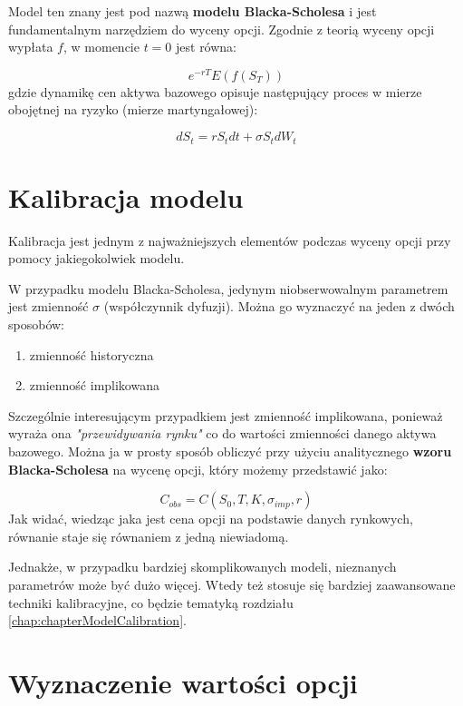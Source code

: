 \documentclass{pracamgr}
\begin{document}
Model ten znany jest pod nazwą \textbf{modelu Blacka-Scholesa} i jest fundamentalnym narzędziem do wyceny opcji.
Zgodnie z teorią wyceny opcji wypłata $f$, w momencie $t = 0$ jest równa:

\begin{equation}
  e^{-rT} E(f(S_T))
\end{equation}
gdzie dynamikę cen aktywa bazowego opisuje następujący proces w mierze obojętnej na ryzyko (mierze martyngałowej):

\begin{equation}
  dS_t = r S_t dt + \sigma S_t d W_t 
\end{equation}


\section{Kalibracja modelu}
Kalibracja jest jednym z najważniejszych elementów podczas wyceny opcji przy pomocy jakiegokolwiek modelu.  

W przypadku modelu Blacka-Scholesa, jedynym niobserwowalnym parametrem jest zmienność $\sigma$ (współczynnik dyfuzji).
Można go wyznaczyć na jeden z dwóch sposobów:
\begin{enumerate}
  \item zmienność historyczna
  \item zmienność implikowana
\end{enumerate}

Szczególnie interesującym przypadkiem jest zmienność implikowana, ponieważ wyraża ona \textit{"przewidywania rynku"} co 
do wartości zmienności danego aktywa bazowego. 
Można ja w prosty sposób obliczyć przy użyciu analitycznego \textbf{wzoru Blacka-Scholesa} na wycenę opcji, który 
możemy przedstawić jako:

\begin{equation}
  C_{obs} = C(S_0, T, K, \sigma_{imp}, r)
\end{equation}
Jak widać, wiedząc jaka jest cena opcji na podstawie danych rynkowych, równanie staje się równaniem z jedną niewiadomą. 

Jednakże, w przypadku bardziej skomplikowanych modeli, nieznanych parametrów może być dużo więcej. Wtedy też 
stosuje się bardziej zaawansowane techniki kalibracyjne, co będzie tematyką rozdziału \ref{chap:chapterModelCalibration}.


\section{Wyznaczenie wartości opcji}
\end{document}
